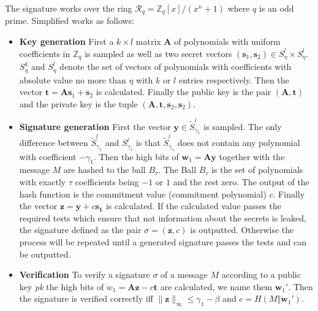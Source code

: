 \documentclass[a4paper,titlepage]{article}
\newcommand\norm[1]{\lVert#1\rVert}
\begin{document}
The signature works over the ring $\mathcal{R}_q = \mathds{Z}_q[x]/(x^n+1)$ where $q$ is an odd prime. Simplified works as follows:
\begin{itemize}
    \item \textbf{Key generation} First a $k \times l$ matrix $\bm{A}$ of polynomials with uniform coefficients in $\mathds{Z}_q$ is sampled as well as two secret vectors $(\bm{s}_1, \bm{s}_2) \in S_\eta^l \times S_\eta^l$. $S_\eta^k$ and $S_\eta^l$ denote the set of vectors of polynomials with coefficients with absolute value no more than $\eta$ with $k$ or $l$ entries respectively.
    Then the vector $\bm{t} = \bm{A}\bm{s}_1 + \bm{s}_2$ is calculated.
    Finally the public key is the pair $(\bm{A}, \bm{t})$ and the private key is the tuple $(\bm{A}, \bm{t}, \bm{s}_2, \bm{s}_2)$.
    
    \item \textbf{Signature generation}
    First the vector $\bm{y} \in \tilde{S}_{\gamma_1}^l$ is sampled. The only difference between $\tilde{S}_{\gamma_1}^l$ and $S_{\gamma_1}^l$ is that $\tilde{S}_{\gamma_1}^l$ does not contain any polynomial with coefficient $-\gamma_1$.
    Then the high bits of $\bm{w}_1 = \bm{A}\bm{y}$ together with the message $M$ are hashed to the ball $B_\tau$. The Ball $B_\tau$ is the set of polynomials with exactly $\tau$ coefficients being $-1$ or $1$ and the rest zero. The output of the hash function is the commitment value (commitment polynomial) $c$.
    Finally the vector $\bm{z} = \bm{y} + c \bm{s_1}$ is calculated. If the calculated value passes the required tests which ensure that not information about the secrets is leaked, the signature defined as the pair $\sigma = (\bm{z}, c)$ is outputted. Otherwise the process will be repeated until a generated signature passes the tests and can be outputted.
    
    \item \textbf{Verification}
    To verify a signature $\sigma$ of a message $M$ according to a public key \textit{pk} the high bits of $w_1 = \bm{A} \bm{z} - c \bm{t}$ are calculated, we name them $\bm{w}_1'$. Then the signature is verified correctly iff $\norm{\bm{z}}_\infty \leq \gamma_1 - \beta$ and $c = H(M \Vert \bm{w}_1')$.
\end{itemize}
\end{document}
